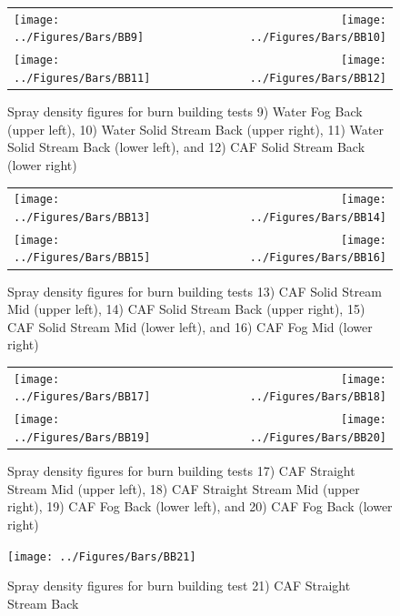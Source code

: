 \documentclass[12pt,oneside]{book}
\begin{document}
\clearpage

\begin{figure}[ht]
\begin{tabular*}{\textwidth}{lr}
\texttt{[image: ../Figures/Bars/BB9]} &
\texttt{[image: ../Figures/Bars/BB10]} \\
\texttt{[image: ../Figures/Bars/BB11]} &
\texttt{[image: ../Figures/Bars/BB12]}
\end{tabular*}
\caption{Spray density figures for burn building tests 9) Water Fog Back (upper left), 10) Water Solid Stream Back (upper right), 11) Water Solid Stream Back (lower left), and 12) CAF Solid Stream Back (lower right)}
\label{fig:bb_9_12}
\end{figure}

\clearpage

\begin{figure}[ht]
\begin{tabular*}{\textwidth}{lr}
\texttt{[image: ../Figures/Bars/BB13]} &
\texttt{[image: ../Figures/Bars/BB14]} \\
\texttt{[image: ../Figures/Bars/BB15]} &
\texttt{[image: ../Figures/Bars/BB16]}
\end{tabular*}
\caption{Spray density figures for burn building tests 13) CAF Solid Stream Mid (upper left), 14) CAF Solid Stream Back (upper right), 15) CAF Solid Stream Mid (lower left), and 16) CAF Fog Mid (lower right)}
\label{fig:bb_13_16}
\end{figure}

\clearpage

\begin{figure}[ht]
\begin{tabular*}{\textwidth}{lr}
\texttt{[image: ../Figures/Bars/BB17]} &
\texttt{[image: ../Figures/Bars/BB18]} \\
\texttt{[image: ../Figures/Bars/BB19]} &
\texttt{[image: ../Figures/Bars/BB20]}
\end{tabular*}
\caption{Spray density figures for burn building tests 17) CAF Straight Stream Mid (upper left), 18) CAF Straight Stream Mid (upper right), 19) CAF Fog Back (lower left), and 20) CAF Fog Back (lower right)}
\label{fig:bb_19_21}
\end{figure}

\clearpage

\begin{figure}[ht]
\centering
\texttt{[image: ../Figures/Bars/BB21]}
\caption{Spray density figures for burn building test 21) CAF Straight Stream Back}
\label{fig:bb_21}
\end{figure}
\end{document}
